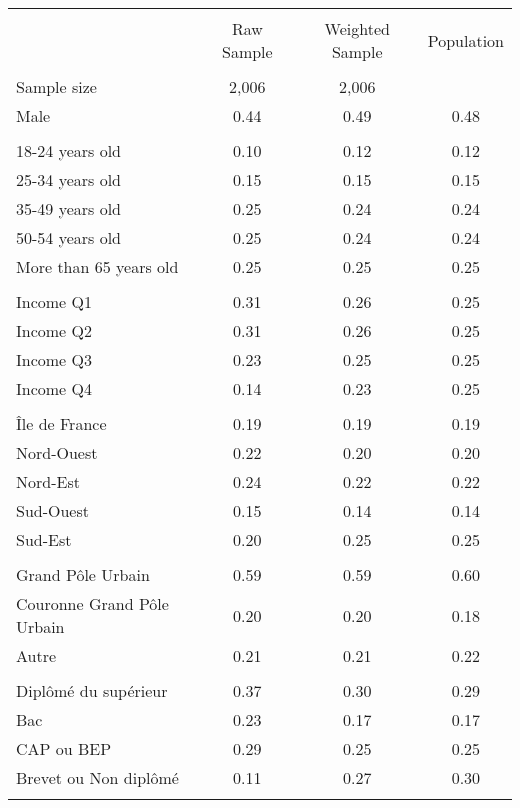 \begin{tabular}{lccc}
\toprule
\hline \\[-1.8ex]
\noalign{\smallskip}  & Raw Sample & Weighted Sample & Population\\
\hline \\[-1.8ex] 
Sample size & 2,006 & 2,006 &  \\
\noalign{\smallskip}\hline \noalign{\smallskip}Male & 0.44 & 0.49 & 0.48\\ 
\\
18-24 years old & 0.10 & 0.12 & 0.12\\
25-34 years old & 0.15 & 0.15 & 0.15\\
35-49 years old & 0.25 & 0.24 & 0.24\\
50-54 years old & 0.25 & 0.24 & 0.24\\
More than 65 years old & 0.25 & 0.25 & 0.25\\ 
\\
Income Q1 & 0.31 & 0.26 & 0.25\\
Income Q2 & 0.31 & 0.26 & 0.25\\
Income Q3 & 0.23 & 0.25 & 0.25\\
Income Q4 & 0.14 & 0.23 & 0.25\\
\\
Île de France & 0.19 & 0.19 & 0.19\\
Nord-Ouest & 0.22 & 0.20 & 0.20\\
Nord-Est & 0.24 & 0.22 & 0.22\\
Sud-Ouest & 0.15 & 0.14 & 0.14\\
Sud-Est & 0.20 & 0.25 & 0.25\\
\\
Grand Pôle Urbain & 0.59 & 0.59 & 0.60\\
Couronne Grand Pôle Urbain & 0.20 & 0.20 & 0.18\\
Autre & 0.21 & 0.21 & 0.22\\
\\
Diplômé du supérieur & 0.37 & 0.30 & 0.29\\
Bac & 0.23 & 0.17 & 0.17\\
CAP ou BEP & 0.29 & 0.25 & 0.25\\
Brevet ou Non diplômé & 0.11 & 0.27 & 0.30\\
\\
\end{tabular}